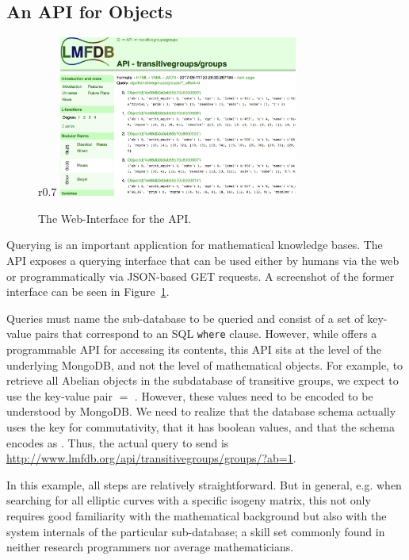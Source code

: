 \subsection{An API for \lmfdb Objects}\label{sec:sota:api}

\begin{figure}r{0.7\textwidth}\centering\vspace*{-2.5em}
  \includegraphics[width=0.7\textwidth]{APIScreenshot}
  \caption[The Web-Interface for the \lmfdb API. ]{
    The Web-Interface for the \lmfdb API. 
  }\vspace*{-1.5em}
  \label{fig:apiscreenshot}
\end{figure}
Querying is an important application for mathematical knowledge bases.
The \lmfdb API \cite{lmfdbapi} exposes a querying interface that can be used either by humans via the web or programmatically via JSON-based GET requests.
A screenshot of the former interface can be seen in Figure~\ref{fig:apiscreenshot}. 

Queries must name the sub-database to be queried and consist of a set of key-value pairs that correspond to an SQL \texttt{where} clause.
However, while \lmfdb offers a programmable API for accessing its contents, this API sits at the level of the underlying MongoDB, and not the level of mathematical objects. 
For example, to retrieve all Abelian objects in the subdatabase of transitive groups, we expect to use the key-value pair $ = $ . 
However, these values need to be encoded to be understood by MongoDB.
We need to realize that the database schema actually uses the key  for commutativity, that it has boolean values, and that the schema encodes  as . 
Thus, the actual query to send is \url{http://www.lmfdb.org/api/transitivegroups/groups/?ab=1}. 

In this example, all steps are relatively straightforward. 
But in general, e.g. when searching for all elliptic curves with a specific isogeny matrix, this not only requires good familiarity with the mathematical background but also with the system internals of the particular \lmfdb sub-database; a skill set commonly found in neither research programmers nor average mathematicians.   

